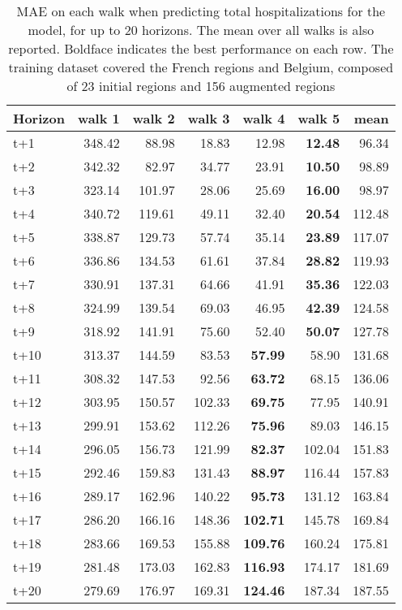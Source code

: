 \begin{table}[H]
\centering
\caption{MAE on each walk when predicting total hospitalizations for the model, for up to 20 horizons. The mean over all walks is also reported. Boldface indicates the best performance on each row. The training dataset covered the French regions and Belgium, composed of 23 initial regions and 156 augmented regions }
\label{tab:MAE_walk_encoder_decoder}
\begin{tabular}{lrrrrrr}
\toprule
Horizon &  walk 1 &  walk 2 &  walk 3 &  walk 4 &  walk 5 &   mean \\
\midrule
t+1  & 348.42  & 88.98  & 18.83  & 12.98  & \textbf{12.48}  & 96.34  \\
t+2  & 342.32  & 82.97  & 34.77  & 23.91  & \textbf{10.50}  & 98.89  \\
t+3  & 323.14  & 101.97  & 28.06  & 25.69  & \textbf{16.00}  & 98.97  \\
t+4  & 340.72  & 119.61  & 49.11  & 32.40  & \textbf{20.54}  & 112.48  \\
t+5  & 338.87  & 129.73  & 57.74  & 35.14  & \textbf{23.89}  & 117.07  \\
t+6  & 336.86  & 134.53  & 61.61  & 37.84  & \textbf{28.82}  & 119.93  \\
t+7  & 330.91  & 137.31  & 64.66  & 41.91  & \textbf{35.36}  & 122.03  \\
t+8  & 324.99  & 139.54  & 69.03  & 46.95  & \textbf{42.39}  & 124.58  \\
t+9  & 318.92  & 141.91  & 75.60  & 52.40  & \textbf{50.07}  & 127.78  \\
t+10  & 313.37  & 144.59  & 83.53  & \textbf{57.99}  & 58.90  & 131.68  \\
t+11  & 308.32  & 147.53  & 92.56  & \textbf{63.72}  & 68.15  & 136.06  \\
t+12  & 303.95  & 150.57  & 102.33  & \textbf{69.75}  & 77.95  & 140.91  \\
t+13  & 299.91  & 153.62  & 112.26  & \textbf{75.96}  & 89.03  & 146.15  \\
t+14  & 296.05  & 156.73  & 121.99  & \textbf{82.37}  & 102.04  & 151.83  \\
t+15  & 292.46  & 159.83  & 131.43  & \textbf{88.97}  & 116.44  & 157.83  \\
t+16  & 289.17  & 162.96  & 140.22  & \textbf{95.73}  & 131.12  & 163.84  \\
t+17  & 286.20  & 166.16  & 148.36  & \textbf{102.71}  & 145.78  & 169.84  \\
t+18  & 283.66  & 169.53  & 155.88  & \textbf{109.76}  & 160.24  & 175.81  \\
t+19  & 281.48  & 173.03  & 162.83  & \textbf{116.93}  & 174.17  & 181.69  \\
t+20  & 279.69  & 176.97  & 169.31  & \textbf{124.46}  & 187.34  & 187.55  \\

\bottomrule
\end{tabular}
\end{table}
